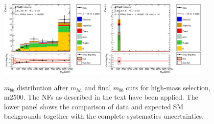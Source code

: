 \begin{figure}
\begin{center}
\includegraphics*[width=0.47\textwidth] {figures/Unblinded_mbb/C_reOpt2000_bbpt350_wwpt250_drww15_hh2500_bbMass_regionA_met25d020.eps}
\includegraphics*[width=0.47\textwidth] {figures/Unblinded_mbb/C_reOpt2000_bbpt350_wwpt250_drww15_hh2500_mbb_bbMass_regionA_met25d020.eps}
\caption[$m_{bb}$ distribution after $m_{hh}$ and final $m_{bb}$ cuts for high-mass selection, m2500.]{$m_{bb}$ distribution after $m_{hh}$ and final $m_{bb}$ cuts for high-mass selection, m2500. The NFs as described in the text have been applied. The lower panel shows the comparison of data and expected SM backgrounds together with the complete systematics uncertainties.}
\end{center}
\end{figure}

